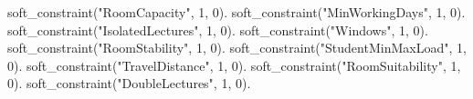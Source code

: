 soft_constraint("RoomCapacity",      1, 0).  soft_constraint("MinWorkingDays",    1, 0).
soft_constraint("IsolatedLectures",  1, 0).  soft_constraint("Windows",           1, 0).
soft_constraint("RoomStability",     1, 0).  soft_constraint("StudentMinMaxLoad", 1, 0).
soft_constraint("TravelDistance",    1, 0).  soft_constraint("RoomSuitability",   1, 0).
soft_constraint("DoubleLectures",    1, 0).

